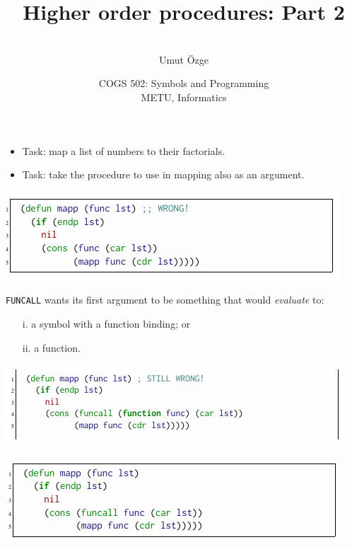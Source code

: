 \documentclass[ignorenonframetext,10pt,aspectratio=169]{beamer}
\title{Higher order procedures: Part 2}
\author{\  \\ \vspace{20pt} Umut \"Ozge\\  }
\date{COGS 502: Symbols and Programming \\ METU, Informatics}
\begin{document}
\begin{frame}\frametitle{}
\thispagestyle{empty}
\maketitle
\end{frame}

\begin{frame}[t,plain]


\end{frame}

\begin{frame}[plain]
\begin{itemize}
\item Task: map a list of numbers to their factorials.
\pause
\item Task: take the procedure to use in mapping also as an argument. 
\end{itemize}
\end{frame}

\begin{frame}[t,plain]

\includegraphics[scale=0.7]{img/mapp1.png}

\end{frame}

\begin{frame}[t,plain]
\Verb+FUNCALL+ wants its first argument to be something that would \emph{evaluate} to:
\begin{itemize}
\item[i.] a symbol with a function binding; or 
\item[ii.] a function.
\end{itemize}
\end{frame}


\begin{frame}[t,plain]

\includegraphics[scale=0.7]{img/mapp2.png}

\end{frame}

\begin{frame}[t,plain]

\includegraphics[scale=0.7]{img/mapp3.png}

\end{frame}
\end{document}
